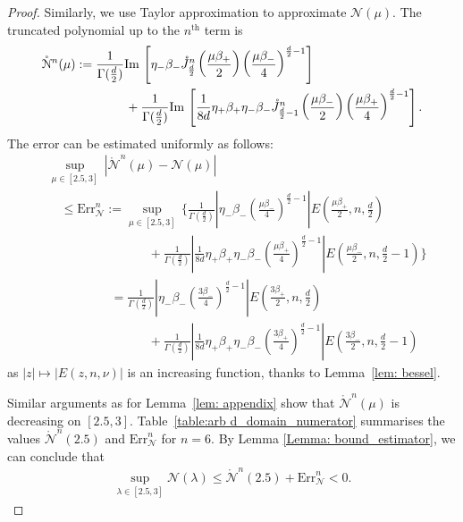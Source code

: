 \documentclass[11pt,a4paper,english,reqno]{amsart}
\theoremstyle{plain}
\newcommand{\1}{\mathbbm{1}}
\begin{document}
\begin{proof}
Similarly, we use Taylor approximation to approximate $\mathcal{N}(\mu)$. The truncated polynomial up to the  $n^{\text{th}}$ term is
\begin{align*}
\mathring{\mathcal{N}}^{n}(\mu) &:= \frac{1}{\Gamma(\frac{d}{2})}{\rm Im}\,\left[\eta_{-}\beta_{-}\mathring{J}^{n}_{\frac{d}{2}}\left(\frac{\mu\beta_+}{2}\right)\left(\frac{\mu\beta_- }{4}\right)^{\frac{d}{2}-1}\right] \\
&\qquad\qquad+ \frac{1}{\Gamma(\frac{d}{2})}{\rm Im}\,\left[\frac{1}{8d} \eta_{+}\beta_{+}\eta_-\beta_-\mathring{J}^{n}_{\frac{d}{2}-1}\left(\frac{\mu\beta_-}{2}\right)\left(\frac{\mu\beta_+}{4}\right)^{\frac{d}{2}-1} \right].
\end{align*}
The error can be  estimated uniformly as follows:
\begin{align*}
&\sup_{\mu \in [2.5,3]}\,\left|\mathring{\mathcal{N}}^{n}(\mu) - {\mathcal{N}}(\mu)\right| \\
&\quad\leq \text{Err}^n_{\mathcal{N}} := \sup_{\mu \in [2.5,3]}\,\Bigg\{\frac{1}{\Gamma\left(\frac{d}{2}\right)}\left|\eta_{-}\beta_{-} \left(\frac{\mu\beta_- }{4}\right)^{\frac{d}{2}-1}\right|E\left(\frac{\mu\beta_+}{2}, n, \frac{d}{2}\right)\\
&\qquad\qquad\qquad\qquad+\frac{1}{\Gamma\left(\frac{d}{2}\right)}\left|\frac{1}{8d} \eta_{+}\beta_{+}\eta_-\beta_- \left(\frac{\mu\beta_+}{4}\right)^{\frac{d}{2}-1}\right| E\left(\frac{\mu\beta_-}{2}, n, \frac{d}{2}-1\right)\Bigg\}\\
&\quad\qquad\qquad=\frac{1}{\Gamma\left(\frac{d}{2}\right)}\left|\eta_{-}\beta_{-} \left(\frac{3\beta_- }{4}\right)^{\frac{d}{2}-1}\right|E\left(\frac{3\beta_+}{2}, n, \frac{d}{2}\right)\\
&\quad\qquad\qquad\qquad\quad+\frac{1}{\Gamma\left(\frac{d}{2}\right)}\left|\frac{1}{8d} \eta_{+}\beta_{+}\eta_-\beta_- \left(\frac{3\beta_+}{4}\right)^{\frac{d}{2}-1}\right| E\left(\frac{3\beta_-}{2}, n, \frac{d}{2}-1\right)
\end{align*}
as $|z|\mapsto\left|E(z,n,\nu)\right|$ is an increasing function, thanks to Lemma~\ref{lem: bessel}.

Similar arguments as for Lemma~\ref{lem: appendix} show that $\mathring{\mathcal{N}}^{n}(\mu)$ is decreasing on $[2.5,3]$. Table~\ref{table:arb d_domain_numerator} summarises the values $\mathring{\mathcal{N}}^{n}(2.5)$ and $\text{Err}^{n}_{\mathcal{N}}$ for $n = 6$. By Lemma \ref{Lemma: bound_estimator}, we can conclude that
\begin{eqnarray*}
\sup_{\lambda \in [2.5, 3]}\mathcal{N}(\lambda) \leq \mathring{\mathcal{N}}^{n}(2.5) + \text{Err}^{n}_{\mathcal{N}} < 0.
\end{eqnarray*}


\end{proof}
\end{document}
